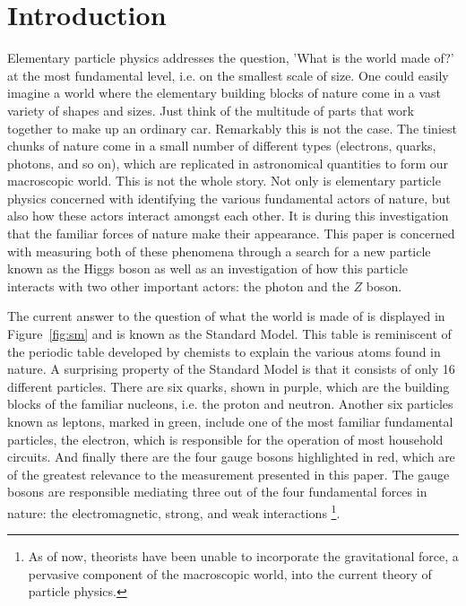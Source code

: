 
\section{Introduction} %





Elementary particle physics addresses the question, 'What is the world made of?' 
at the most fundamental level, i.e. on the smallest scale of size. 
One could easily imagine a world where the elementary building blocks of 
nature come in a vast variety of shapes and sizes. Just think of the multitude of 
parts that work together to make up an ordinary car. Remarkably this is not
the case. The tiniest chunks of nature come in a small number of different types
(electrons, quarks, photons, and so on), which are replicated in astronomical
quantities to form our macroscopic world. This is not the whole story.
Not only is elementary particle physics concerned with identifying the various 
fundamental actors of nature, but also how these actors interact amongst each other.
It is during this investigation that the familiar forces of nature make their
appearance. This paper is concerned with measuring both of these phenomena through 
a search for a new particle known as the Higgs boson as well as an investigation of
how this particle interacts with two other important actors: the photon and the 
$Z$ boson.

The current answer to the question of what the world is made of is displayed in 
Figure~\ref{fig:sm} and is known as the Standard Model. This table is reminiscent
of the periodic table developed by chemists to explain the various atoms
found in nature. A surprising property of the Standard Model is that it consists
of only 16 different particles. There are six quarks, shown in purple, which
are the building blocks of the familiar nucleons, i.e. the proton and neutron.
Another six particles known as leptons, marked in green, include one of
the most familiar fundamental particles, the electron, 
which is responsible for the operation of most household circuits. And
finally there are the four gauge bosons highlighted in red, which are of the 
greatest relevance to the measurement presented in this paper.
The gauge bosons are responsible mediating three 
out of the four fundamental forces in nature: the electromagnetic, strong, and 
weak interactions
\footnote{As of now, theorists have been unable to incorporate the 
gravitational force, a pervasive component of the macroscopic world,
into the current theory of particle physics.}.

